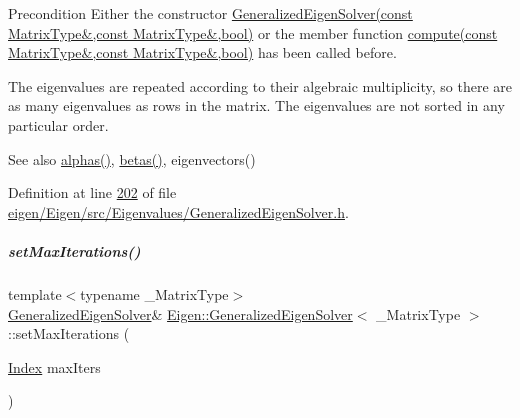 \begin{DoxyPrecond}{Precondition}
Either the constructor \hyperlink{group___eigenvalues___module_a2a3528cbf75f66d3a60af9dc7b12ff65}{Generalized\+Eigen\+Solver(const Matrix\+Type\&,const Matrix\+Type\&,bool)} or the member function \hyperlink{group___eigenvalues___module_a275910b47dfe5f40211dcb59cfd68f3c}{compute(const Matrix\+Type\&,const Matrix\+Type\&,bool)} has been called before.
\end{DoxyPrecond}
The eigenvalues are repeated according to their algebraic multiplicity, so there are as many eigenvalues as rows in the matrix. The eigenvalues are not sorted in any particular order.

\begin{DoxySeeAlso}{See also}
\hyperlink{group___eigenvalues___module_a82b1bc41267f46e5c5899d5b084a73bb}{alphas()}, \hyperlink{group___eigenvalues___module_abeaa6f56cee367b83fd09d428462ca0c}{betas()}, eigenvectors() 
\end{DoxySeeAlso}


Definition at line \hyperlink{eigen_2_eigen_2src_2_eigenvalues_2_generalized_eigen_solver_8h_source_l00202}{202} of file \hyperlink{eigen_2_eigen_2src_2_eigenvalues_2_generalized_eigen_solver_8h_source}{eigen/\+Eigen/src/\+Eigenvalues/\+Generalized\+Eigen\+Solver.\+h}.

\mbox{\label{group___eigenvalues___module_a2a6f96bd042068cfc0eafba839b424bd}} 
\subparagraph{\texorpdfstring{set\+Max\+Iterations()}{setMaxIterations()}\hspace{0.1cm}{\footnotesize\ttfamily [1/2]}}
{\footnotesize\ttfamily template$<$typename \+\_\+\+Matrix\+Type$>$ \\
\hyperlink{group___eigenvalues___module_class_eigen_1_1_generalized_eigen_solver}{Generalized\+Eigen\+Solver}\& \hyperlink{group___eigenvalues___module_class_eigen_1_1_generalized_eigen_solver}{Eigen\+::\+Generalized\+Eigen\+Solver}$<$ \+\_\+\+Matrix\+Type $>$\+::set\+Max\+Iterations (\begin{DoxyParamCaption}\item[{\hyperlink{group___eigenvalues___module_a46a0ff3841059479ec314e56a5645302}{Index}}]{max\+Iters }\end{DoxyParamCaption})\hspace{0.3cm}{\ttfamily [inline]}}

